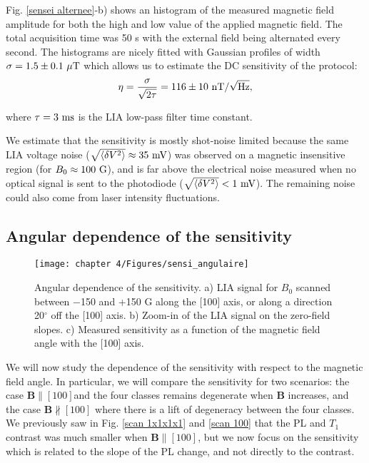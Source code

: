 \documentclass[a4paper, 11pt]{report}
\begin{document}
Fig. \ref{sensei alternee}-b) shows an histogram of the measured magnetic field amplitude for both the high and low value of the applied magnetic field. The total acquisition time was 50 s with the external field being alternated every second. The histograms are nicely fitted with Gaussian profiles of width $\sigma=1.5\pm 0.1\ \rm{\mu T}$ which allows us to estimate the DC sensitivity of the protocol:
\begin{equation}
\eta = \frac{\sigma}{\sqrt{2 \tau}}= 116 \pm 10\ \rm{nT} / \sqrt{\rm Hz},
\end{equation}

where $\tau=3\ \rm ms$ is the LIA low-pass filter time constant. 

We estimate that the sensitivity is mostly shot-noise limited because the same LIA voltage noise ($\sqrt{\langle \delta V^2 \rangle} \approx 35\ \rm mV$) was observed on a magnetic insensitive region (for $B_0 \approx 100\ \rm G$), and is far above the electrical noise measured when no optical signal is sent to the photodiode ($\sqrt{\langle \delta V^2 \rangle} < 1\ \rm mV$). The remaining noise could also come from laser intensity fluctuations.

\subsection{Angular dependence of the sensitivity}
\label{sec angular sensi}
\begin{figure}[h!]
\centering
\texttt{[image: chapter 4/Figures/sensi\_angulaire]}
\caption{Angular dependence of the sensitivity. a) LIA signal for $B_0$ scanned between $-$150 and +150 G along the [100] axis, or along a direction 20$^\circ$ off the [100] axis. b) Zoom-in of the LIA signal on the zero-field slopes. c) Measured sensitivity as a function of the magnetic field angle with the [100] axis.}
\label{angular sensi}
\end{figure}

We will now study the dependence of the sensitivity with respect to the magnetic field angle. In particular, we will compare the sensitivity for two scenarios: the case $\mathbf{B}\parallel [100]$and the four classes remains degenerate when $\mathbf{B}$ increases, and the case $\mathbf{B}\nparallel [100]$ where there is a lift of degeneracy between the four classes. We previously saw in Fig. \ref{scan 1x1x1x1} and \ref{scan 100} that the PL and $T_1$ contrast was much smaller when $\mathbf{B}\parallel [100]$, but we now focus on the sensitivity which is related to the slope of the PL change, and not directly to the contrast.
\end{document}
